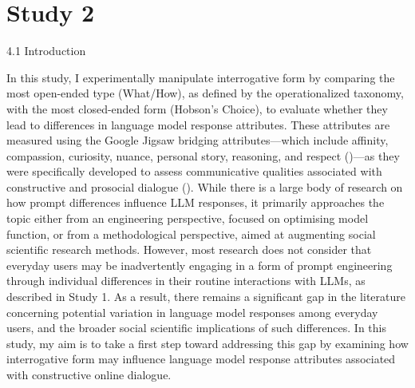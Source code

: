 \documentclass[
  12pt,
]{article}
\begin{document}
\section{Study 2}\label{study-2}

4.1 Introduction

In this study, I experimentally manipulate interrogative form by comparing the most open-ended type (What/How), as defined by the operationalized taxonomy, with the most closed-ended form (Hobson's Choice), to evaluate whether they lead to differences in language model response attributes. These attributes are measured using the Google Jigsaw bridging attributes---which include affinity, compassion, curiosity, nuance, personal story, reasoning, and respect ()---as they were specifically developed to assess communicative qualities associated with constructive and prosocial dialogue (). While there is a large body of research on how prompt differences influence LLM responses, it primarily approaches the topic either from an engineering perspective, focused on optimising model function, or from a methodological perspective, aimed at augmenting social scientific research methods. However, most research does not consider that everyday users may be inadvertently engaging in a form of prompt engineering through individual differences in their routine interactions with LLMs, as described in Study 1. As a result, there remains a significant gap in the literature concerning potential variation in language model responses among everyday users, and the broader social scientific implications of such differences. In this study, my aim is to take a first step toward addressing this gap by examining how interrogative form may influence language model response attributes associated with constructive online dialogue.
\end{document}

